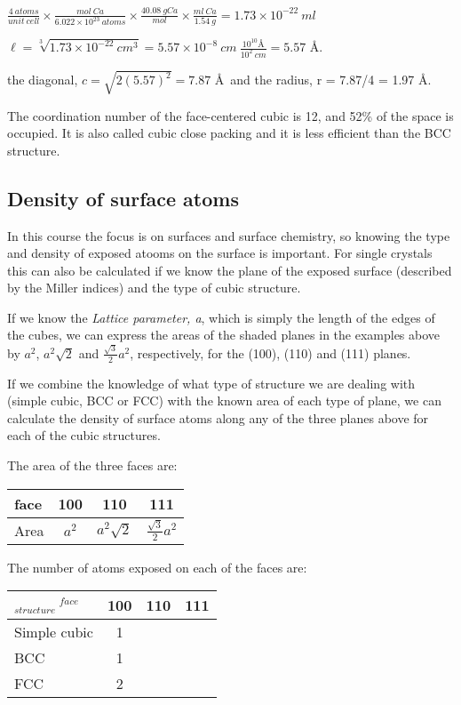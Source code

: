 \documentclass[ignorenonframetext]{beamer}
\begin{document}
\(\frac{4\ atoms}{unit\ cell}\times\frac{mol\ Ca}{6.022\times10^{23}\ atoms}\times\frac{40.08\ gCa}{mol}\times\frac{ml\ Ca}{1.54\ g} = 1.73\times10^{-22}\ ml\)

\(\ell = \sqrt[3]{1.73\times10^{-22}\ cm^3} = 5.57\times10^{-8}\ cm\ \frac{10^{10}\text{\AA}}{10^2\ cm} = 5.57\) \AA.

the diagonal, \(c=\sqrt{2(5.57)^2} = 7.87\) \AA\ and the radius, r =  7.87/4 = 1.97 \AA.

The coordination number of the face-centered cubic is 12, and 52\% of the space is occupied. It is also called cubic close packing and it is less efficient than the BCC structure.

\subsection{Density of surface atoms}

In this course the focus is on surfaces and surface chemistry, so knowing the type and density of exposed atooms on the surface is important. For single crystals this can also be calculated if we know the plane of the exposed surface (described by the Miller indices) and the type of cubic structure.

If we know the \textit{Lattice parameter, a}, which is simply the length of the edges of the cubes, we can express the areas of the shaded planes in the examples above by \(a^2\), \(a^2\sqrt{2}\) and \(\frac{\sqrt{3}}{2}a^2\), respectively, for the (100), (110) and (111) planes. 

If we combine the knowledge of what type of structure we are dealing with (simple cubic, BCC or FCC) with the known area of each type of plane, we can calculate the density of surface atoms along any of the three planes above for each of the cubic structures.

The area of the three faces are:

\begin{tabular}{l | c | c | c}
face & 100 & 110 & 111 \\ \hline
Area & \(a^2\) & \(a^2\sqrt{2}\) & \(\frac{\sqrt{3}}{2}a^2\) \\
\hline
\end{tabular}

The number of atoms exposed on each of the faces are:

\begin{tabular}{l | c | c | c}
\(_{structure}\ ^{face}\) & 100 & 110 & 111 \\ \hline
Simple cubic & 1  &   &  \\
BCC & 1 & &\\
FCC & 2 & &\\\hline
\end{tabular}
\end{document}
